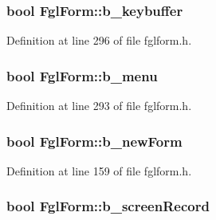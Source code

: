 \hypertarget{classFglForm_ae5096059ba81229c8e0070e85286420f}{
\subsubsection[{b\_\-keybuffer}]{\setlength{\rightskip}{0pt plus 5cm}bool {\bf FglForm::b\_\-keybuffer}}}
\label{classFglForm_ae5096059ba81229c8e0070e85286420f}


Definition at line 296 of file fglform.h.

\hypertarget{classFglForm_ac1f8bea18516701b1192825f83e962d7}{
\subsubsection[{b\_\-menu}]{\setlength{\rightskip}{0pt plus 5cm}bool {\bf FglForm::b\_\-menu}}}
\label{classFglForm_ac1f8bea18516701b1192825f83e962d7}


Definition at line 293 of file fglform.h.

\hypertarget{classFglForm_ab089d04abad8973c262e3c5e1827b070}{
\subsubsection[{b\_\-newForm}]{\setlength{\rightskip}{0pt plus 5cm}bool {\bf FglForm::b\_\-newForm}}}
\label{classFglForm_ab089d04abad8973c262e3c5e1827b070}


Definition at line 159 of file fglform.h.

\hypertarget{classFglForm_a656061ca98f40226c99fa61b12ced56c}{
\subsubsection[{b\_\-screenRecord}]{\setlength{\rightskip}{0pt plus 5cm}bool {\bf FglForm::b\_\-screenRecord}}}
\label{classFglForm_a656061ca98f40226c99fa61b12ced56c}


